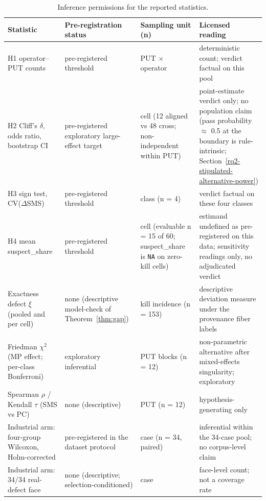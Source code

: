 \documentclass[manuscript,screen,review]{acmart}
\begin{document}
{%
\begin{longtable}[]{@{}
  >{\raggedright\arraybackslash}p{}
  >{\raggedright\arraybackslash}p{}
  >{\raggedright\arraybackslash}p{}
  >{\raggedright\arraybackslash}p{}@{}}
\caption{Inference permissions for the reported statistics.}\label{tab:inference-permissions}\\
\toprule\noalign{}
Statistic & Pre-registration status & Sampling unit (n) & Licensed reading \\
\midrule\noalign{}
\endfirsthead
\endhead
\bottomrule\noalign{}
\endlastfoot
H1 operator--PUT counts & pre-registered threshold & PUT $\times$
operator & deterministic count; verdict factual on this pool \\
H2 Cliff's $\delta$, odds ratio, bootstrap CI & pre-registered
exploratory large-effect target & cell (12 aligned vs 48 cross;
non-independent within PUT) & point-estimate verdict only; no
population claim (pass probability $\approx$ 0.5 at the boundary is
rule-intrinsic; Section~\ref{rq2-stipulated-alternative-power}) \\
H3 sign test, CV($\Delta$SMS) & pre-registered threshold & class (n = 4)
& verdict factual on these four classes \\
H4 mean suspect\_share & pre-registered threshold & cell (evaluable
n = 15 of 60; suspect\_share is \texttt{NA} on zero-kill cells) &
estimand undefined as pre-registered on this data; sensitivity readings
only, no adjudicated verdict \\
Exactness defect $\xi$ (pooled and per cell) & none (descriptive
model-check of Theorem~\ref{thm:gap}) & kill incidence (n = 153) &
descriptive deviation measure under the provenance fiber labels \\
Friedman $\chi^2$ (MP effect; per-class Bonferroni) & exploratory
inferential & PUT blocks (n = 12) & non-parametric alternative after
mixed-effects singularity; exploratory \\
Spearman $\rho$ / Kendall $\tau$ (SMS vs PC) & none (descriptive) & PUT
(n = 12) & hypothesis-generating only \\
Industrial arm: four-group Wilcoxon, Holm-corrected & pre-registered in
the dataset protocol & case (n = 34, paired) & inferential within the
34-case pool; no corpus-level claim \\
Industrial arm: 34/34 real-defect face & none (descriptive; selection-conditioned) & case &
face-level count; not a coverage rate \\
\end{longtable}
}
\end{document}
